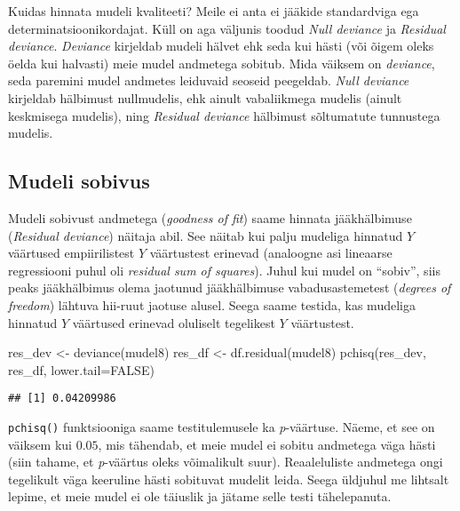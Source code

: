 \documentclass[
]{book}
\newenvironment{Shaded}{\begin{snugshade}}{\end{snugshade}}
\newcommand{\AttributeTok}[1]{\textcolor[rgb]{0.77,0.63,0.00}{#1}}
\newcommand{\ConstantTok}[1]{\textcolor[rgb]{0.00,0.00,0.00}{#1}}
\newcommand{\FunctionTok}[1]{\textcolor[rgb]{0.00,0.00,0.00}{#1}}
\newcommand{\NormalTok}[1]{#1}
\newcommand{\OtherTok}[1]{\textcolor[rgb]{0.56,0.35,0.01}{#1}}
\begin{document}
Kuidas hinnata mudeli kvaliteeti? Meile ei anta ei jääkide standardviga ega determinatsioonikordajat. Küll on aga väljunis toodud \emph{Null deviance} ja \emph{Residual deviance}. \emph{Deviance} kirjeldab mudeli hälvet ehk seda kui hästi (või õigem oleks öelda kui halvasti) meie mudel andmetega sobitub. Mida väiksem on \emph{deviance}, seda paremini mudel andmetes leiduvaid seoseid peegeldab. \emph{Null deviance} kirjeldab hälbimust nullmudelis, ehk ainult vabaliikmega mudelis (ainult keskmisega mudelis), ning \emph{Residual deviance} hälbimust sõltumatute tunnustega mudelis.

\hypertarget{mudeli-sobivus}{%
\subsection{Mudeli sobivus}\label{mudeli-sobivus}}

Mudeli sobivust andmetega (\emph{goodness of fit}) saame hinnata jääkhälbimuse (\emph{Residual deviance}) näitaja abil. See näitab kui palju mudeliga hinnatud \(Y\) väärtused empiirilistest \(Y\) väärtustest erinevad (analoogne asi lineaarse regressiooni puhul oli \emph{residual sum of squares}). Juhul kui mudel on ``sobiv'', siis peaks jääkhälbimus olema jaotunud jääkhälbimuse vabadusastemetest (\emph{degrees of freedom}) lähtuva hii-ruut jaotuse alusel. Seega saame testida, kas mudeliga hinnatud \(Y\) väärtused erinevad oluliselt tegelikest \(Y\) väärtustest.

\begin{Shaded}
\begin{Highlighting}[]
\NormalTok{res\_dev }\OtherTok{\textless{}{-}} \FunctionTok{deviance}\NormalTok{(mudel8)}
\NormalTok{res\_df }\OtherTok{\textless{}{-}} \FunctionTok{df.residual}\NormalTok{(mudel8)}
\FunctionTok{pchisq}\NormalTok{(res\_dev, res\_df, }\AttributeTok{lower.tail=}\ConstantTok{FALSE}\NormalTok{)}
\end{Highlighting}
\end{Shaded}

\begin{verbatim}
## [1] 0.04209986
\end{verbatim}

\texttt{pchisq()} funktsiooniga saame testitulemusele ka \emph{p}-väärtuse. Näeme, et see on väiksem kui \(0.05\), mis tähendab, et meie mudel ei sobitu andmetega väga hästi (siin tahame, et \emph{p}-väärtus oleks võimalikult suur). Reaaleluliste andmetega ongi tegelikult väga keeruline hästi sobituvat mudelit leida. Seega üldjuhul me lihtsalt lepime, et meie mudel ei ole täiuslik ja jätame selle testi tähelepanuta.
\end{document}
